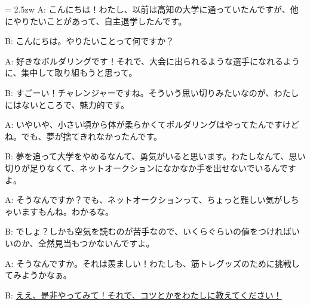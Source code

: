 \documentclass[11pt]{amsart}
\title{}
\author{}
\newenvironment{hangall}[1]{\hangindent = 2.5zw\everypar{\hangindent = 2.5zw}}{}
\begin{document}
\maketitle
\begin{hangall}{}%
A: こんにちは！わたし、以前は高知の大学に通っていたんですが、他にやりたいことがあって、自主退学したんです。

B: こんにちは。やりたいことって何ですか？

A: 好きなボルダリングです！それで、大会に出られるような選手になれるように、集中して取り組もうと思って。

B: すごーい！チャレンジャーですね。そういう思い切りみたいなのが、わたしにはないところで、魅力的です。

A: いやいや、小さい頃から体が柔らかくてボルダリングはやってたんですけどね。でも、夢が捨てきれなかったんです。

B: 夢を追って大学をやめるなんて、勇気がいると思います。わたしなんて、思い切りが足りなくて、ネットオークションになかなか手を出せないでいるんですよ。

A: そうなんですか？でも、ネットオークションって、ちょっと難しい気がしちゃいますもんね。わかるな。

B: でしょ？しかも空気を読むのが苦手なので、いくらぐらいの値をつければいいのか、全然見当もつかないんですよ。

A: そうなんですか。それは羨ましい！わたしも、筋トレグッズのために挑戦してみようかなぁ。

B: \ul{ええ、是非やってみて！それで、コツとかをわたしに教えてください！}\end{hangall}
\end{document}
